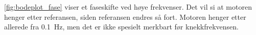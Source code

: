 \autoref{fig:bodeplot_fase} viser et faseskifte ved høye frekvenser. Det vil si at motoren henger etter referansen, siden referansen endres så fort. Motoren henger etter allerede fra \SI{0.1}{\hertz}, men det er ikke spesielt merkbart før knekkfrekvensen.























%     



%     

